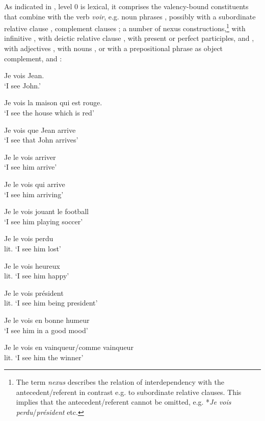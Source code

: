 \documentclass[output=paper]{langsci/langscibook}
\begin{document}
As indicated in , level 0 is lexical, it comprises the valency-bound constituents that combine with the verb \textit{voir}, e.g. noun phrases , possibly with a subordinate relative clause , complement clauses ; a number of nexus constructions,\footnote{The term \textit{nexus} describes the relation of interdependency with the antecedent/referent in contrast e.g. to subordinate relative clauses. This implies that the antecedent/referent cannot be omitted, e.g. *\textit{Je vois perdu}/\textit{président} etc.}  with infinitive , with deictic relative clause , with present or perfect participles,  and , with adjectives , with nouns , or with a prepositional phrase as object complement,  and : 

\begin{exe}
    \ex \label{ex:kragh:1} Je vois Jean. \\
    `I see John.'

    \ex \label{ex:kragh:2}
    Je vois la maison qui est rouge. \\
    ‘I see the house which is red’
    
    \ex \label{ex:kragh:3} Je vois que Jean arrive\\
    ‘I see that John arrives’

    \ex \label{ex:kragh:4} Je le vois arriver\\
    ‘I see him arrive’

    \ex \label{ex:kragh:5} Je le vois qui arrive\\
    ‘I see him arriving’

    \ex \label{ex:kragh:6} Je le vois jouant le football\\
    ‘I see him playing soccer’

    \ex \label{ex:kragh:7} Je le vois perdu\\
    lit. ‘I see him lost’

    \ex \label{ex:kragh:8} Je le vois heureux\\
    lit. ‘I see him happy’

    \ex \label{ex:kragh:9} Je le vois président\\
    lit. ‘I see him being president’

    \ex \label{ex:kragh:10} Je le vois en bonne humeur\\
    ‘I see him in a good mood’

    \ex \label{ex:kragh:11} Je le vois en vainqueur/comme vainqueur\\
    lit. ‘I see him the winner’
\end{exe}
\end{document}
